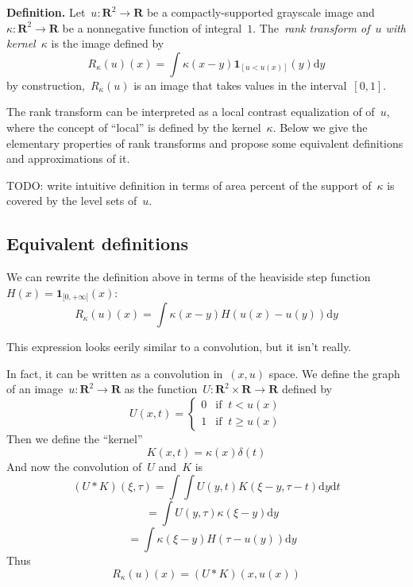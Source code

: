 \documentclass[12pt]{article}                  %
\begin{document}
{\bf Definition.}
Let~$u:\mathbf{R}^2\to\mathbf{R}$ be a compactly-supported grayscale image
and~$\kappa:\mathbf{R}^2\to\mathbf{R}$ be a nonnegative function of
integral~$1$.  The~\emph{rank transform of~$u$ with kernel~$\kappa$} is the
image defined by
\begin{equation}
R_{\kappa}(u)(x) = \int\kappa(x-y)\mathbf{1}_{\left[u < u(x)\right]}(y)\mathrm{d}y
\end{equation}
by construction,~$R_\kappa(u)$ is an image that takes values in the
interval~$[0,1]$.

The rank transform can be interpreted as a local contrast equalization of
of~$u$, where the concept of ``local'' is defined by the kernel~$\kappa$.
Below we give the elementary properties of rank transforms and propose some
equivalent definitions and approximations of it.

TODO: write intuitive definition in terms of area percent of the support
of~$\kappa$ is covered by the level sets of~$u$.

\subsection{Equivalent definitions}

We can rewrite the definition above in terms of the heaviside step
function~$H(x)=\mathbf{1}_{[0,+\infty[}(x)$:
\begin{equation}
R_\kappa(u)(x)=
\int
\kappa(x-y)
H\left(u\left(x\right)-u\left(y\right)\right)
\mathrm{d} y
\end{equation}

This expression looks eerily similar to a convolution, but it isn't really.

In fact, it can be written as a convolution in~$(x,u)$ space.  We define the
graph of an image~$u:\mathbf{R}^2\to\mathbf{R}$ as the
function~$U:\mathbf{R}^2\times\mathbf{R}\to\mathbf{R}$ defined by
\[
	U(x,t) = \begin{cases}
		0 & \textrm{if $\ t< u(x)$} \\
		1 & \textrm{if $\ t\ge u(x)$}
	\end{cases}
\]
Then we define the ``kernel''
\[
	K(x,t) = \kappa(x)\delta(t)
\]
And now the convolution of~$U$ and~$K$ is
\[
	(U*K)(\xi,\tau)
	=
	\int
	\int U\left(y,t\right)K\left(\xi-y,\tau-t\right)
		\mathrm{d} y
		\mathrm{d} t
\]
\[
	\quad
	=\int
	U(y,\tau)
	\kappa(\xi - y)
		\mathrm{d} y
\]
\[
	\quad
	=\int\kappa(\xi-y)H(\tau - u(y))
		\mathrm{d} y
\]
Thus
\begin{equation}\label{eq:convolution1}
	R_\kappa(u)(x)=(U*K)(x,u(x))
\end{equation}
\end{document}
